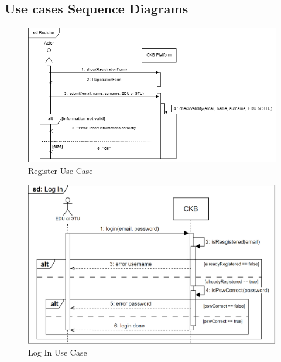 \subsection{Use cases Sequence Diagrams}
\begin{figure}[H]
    \centering
    \includegraphics[width=1\textwidth]{images/sequence_diagrams/ClassDiagram-UC1 -SequenceDiagram.png}
    \caption{Register Use Case}
    \label{fig:uc1}
\end{figure}
\begin{figure}[H]
    \centering
    \includegraphics[width=1\textwidth]{images/sequence_diagrams/.png/Log_In - UC2.png}
    \caption{Log In Use Case}
    \label{fig:uc2}
\end{figure}
